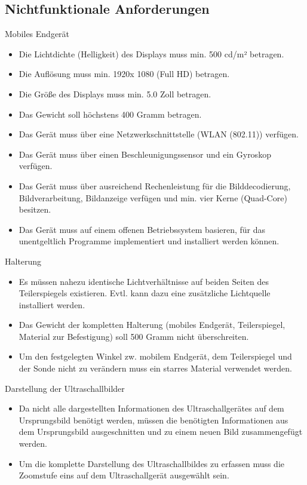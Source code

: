 \subsection{Nichtfunktionale Anforderungen} \label{NichtFunkAnf}
\begin{minipage}{\textwidth}
Mobiles Endgerät
\begin{itemize}
\item Die Lichtdichte (Helligkeit) des Displays muss min. 500 cd/m² betragen.
\item Die Auflösung muss min. 1920x 1080 (Full HD) betragen.
\item Die Größe des Displays muss min. 5.0 Zoll betragen.
\item Das Gewicht soll höchstens 400 Gramm betragen.
\item Das Gerät muss über eine Netzwerkschnittstelle (WLAN (802.11)) verfügen.
\item Das Gerät muss über einen Beschleunigungssensor und ein Gyroskop verfügen.
\item Das Gerät muss über ausreichend Rechenleistung für die Bilddecodierung, Bildverarbeitung, Bildanzeige verfügen und min. vier Kerne (Quad-Core) besitzen.
\item Das Gerät muss auf einem offenen Betriebssystem basieren, für das unentgeltlich Programme implementiert und installiert werden können.\\
\end{itemize}
\end{minipage}

\begin{minipage}{\textwidth}
Halterung
\begin{itemize}
\item Es müssen nahezu identische Lichtverhältnisse auf beiden Seiten des Teilerspiegels existieren. Evtl. kann dazu eine zusätzliche Lichtquelle installiert werden.
\item Das Gewicht der kompletten Halterung (mobiles Endgerät, Teilerspiegel, Material zur Befestigung)  soll 500 Gramm nicht überschreiten.
\item Um den festgelegten Winkel zw. mobilem Endgerät, dem Teilerspiegel und der Sonde nicht zu verändern muss ein starres Material verwendet werden.\\
\end{itemize}
\end{minipage}

\begin{minipage}{\textwidth}
Darstellung der Ultraschallbilder
\begin{itemize}
\item Da nicht alle dargestellten Informationen des Ultraschallgerätes auf dem Ursprungsbild benötigt werden, müssen die benötigten Informationen aus dem Ursprungsbild ausgeschnitten und zu einem neuen Bild zusammengefügt werden.
\item Um die komplette Darstellung des Ultraschallbildes zu erfassen muss die Zoomstufe eins auf dem Ultraschallgerät ausgewählt sein.
\end{itemize}
\end{minipage}

